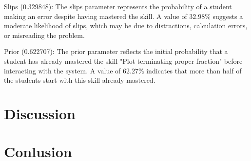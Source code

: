 \documentclass{article}
\begin{document}
Slips (0.329848): The slips parameter represents the probability of a student making an error despite having mastered the skill. A value of 32.98\% suggests a moderate likelihood of slips, which may be due to distractions, calculation errors, or misreading the problem.

Prior (0.622707): The prior parameter reflects the initial probability that a student has already mastered the skill "Plot terminating proper fraction" before interacting with the system. A value of 62.27\% indicates that more than half of the students start with this skill already mastered.

\section{Discussion}
\section{Conlusion}

\printbibliography
\end{document}
